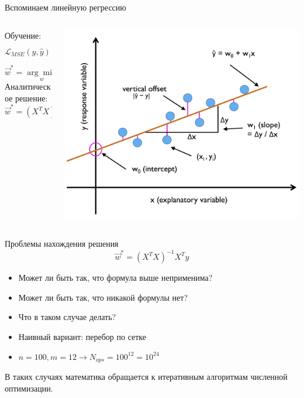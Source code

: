 \documentclass[aspectratio=169]{beamer}
\begin{document}
\begin{frame}{Вспоминаем линейную регрессию}
    \begin{columns}
        \begin{column}{.4\linewidth}
            Обучение:
            \[\mathcal{L}_{MSE}(y, \hat{y}) = \frac{1}{N} \sum_{i=1}^{N} {(y_i - \hat{y}_i)}^2\]
            \[ \vec{w}^* = \underset{w}{\arg\min} \mathcal{L} \]
            Аналитическое решение: \[ \vec{w}^* = {(X^T X)}^{-1} X^T y \]
        \end{column}
        \begin{column}{.5\linewidth}
            \centering
            \includegraphics[width=\linewidth]{graphs/fig3.png}
        \end{column}
    \end{columns}
\end{frame}

\begin{frame}{Проблемы нахождения решения}
    \large{\[ \vec{w}^* = {(X^T X)}^{-1} X^T y \]}
    \begin{itemize}
        \item Может ли быть так, что формула выше неприменима?
        \pause
        \item Может ли быть так, что никакой формулы нет?
        \pause
        \item Что в таком случае делать?
        \pause
        \item Наивный вариант: перебор по сетке
        \item \(n = 100, m = 12 \rightarrow N_{ops} = 100^{12} = 10^{24}\)
    \end{itemize}
    \pause
    В таких случаях математика обращается к итеративным алгоритмам численной оптимизации.
\end{frame}
\end{document}
